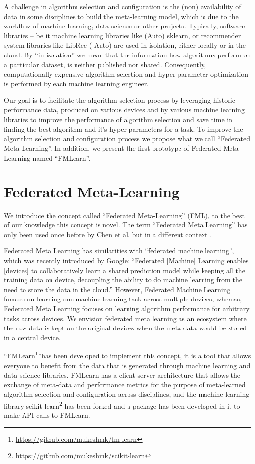 \documentclass{article}
\begin{document}
A challenge in algorithm selection and configuration is the (non) availability of data in some disciplines to build the meta-learning model, which is due to the workflow of machine learning, data science or other projects. Typically, software libraries – be it machine learning libraries like (Auto) sklearn, or recommender system libraries like LibRec (-Auto) are used in isolation, either locally or in the cloud. By “in isolation” we mean that the information how algorithms perform on a particular dataset, is neither published nor shared. Consequently, computationally expensive algorithm selection and hyper parameter optimization is performed by each machine learning engineer. 

Our goal is to facilitate the algorithm selection process by leveraging historic performance data, produced on various devices and by various machine learning libraries to improve the performance of algorithm selection and save time in finding the best algorithm and it's hyper-parameters for a task. To improve the algorithm selection and configuration process we propose what we call “Federated Meta-Learning”. In addition, we present the first prototype of Federated Meta Learning named “FMLearn”. 


\section{Federated Meta-Learning}

We introduce the concept called “Federated Meta-Learning” (FML), to the best of our knowledge this concept is novel. The term “Federated Meta Learning” has only been used once before by Chen et al. but in a different context \cite{chen-et-al}. 

Federated Meta Learning has similarities with “federated machine learning”, which was recently introduced by Google: “Federated [Machine] Learning enables [devices] to collaboratively learn a shared prediction model while keeping all the training data on device, decoupling the ability to do machine learning from the need to store the data in the cloud.”\cite{brendan-et-al} However, Federated Machine Learning focuses on learning one machine learning task across multiple devices, whereas, Federated Meta Learning focuses on learning algorithm performance for arbitrary tasks across devices. We envision federated meta learning as an ecosystem where the raw data is kept on the original devices when the meta data would be stored in a central device.

“FMLearn\footnote{\url{https://github.com/mukeshmk/fm-learn}}”has been developed to implement this concept, it is a tool that allows everyone to benefit from the data that is generated through machine learning and data science libraries. FMLearn has a client-server architecture that allows the exchange of meta-data and performance metrics for the purpose of meta-learned algorithm selection and configuration across disciplines, and the machine-learning library scikit-learn\footnote{\url{https://github.com/mukeshmk/scikit-learn}} has been forked and a package has been developed in it to make API calls to FMLearn.
\end{document}
